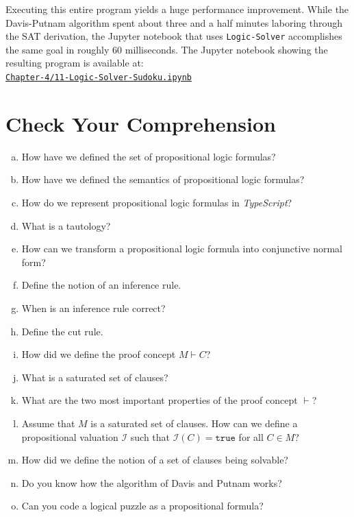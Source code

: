 Executing this entire program yields a huge performance improvement.  While the Davis-Putnam
algorithm spent about three and a half minutes laboring through the SAT derivation, the Jupyter notebook that uses \texttt{Logic-Solver}
accomplishes the same goal in roughly 60 milliseconds.  
The Jupyter notebook showing the resulting program is available at:
\\[0.2cm]
\hspace*{1.3cm}
\href{https://github.com/karlstroetmann/Logic/blob/master/TypeScript/Chapter-4/11-Logic-Solver-Sudoku.ipynb}{\texttt{Chapter-4/11-Logic-Solver-Sudoku.ipynb}}
\pagebreak

\vspace*{\fill}
\pagebreak

\section{Check Your Comprehension}
\begin{enumerate}[(a)]
\item How have we defined the set of propositional logic formulas?
\item How have we defined the semantics of propositional logic formulas?
\item How do we represent propositional logic formulas in \textsl{TypeScript}?
\item What is a tautology?
\item How can we transform a propositional logic formula into conjunctive normal
      form?
\item Define the notion of an inference rule.
\item When is an inference rule correct?
\item Define the cut rule.
\item How did we define the proof concept $M \vdash C$?
\item What is a saturated set of clauses?
\item What are the two most important properties of the proof concept $\vdash$?
\item Assume that $M$ is a saturated set of clauses. How can we define a propositional valuation
      $\mathcal{I}$ such that $\mathcal{I}(C) = \mathtt{true}$ for all $C \in M$?
\item How did we define the notion of a set of clauses being solvable?
\item Do you know how the algorithm of Davis and Putnam works?
\item Can you code a logical puzzle as a propositional formula?
\end{enumerate}


%

